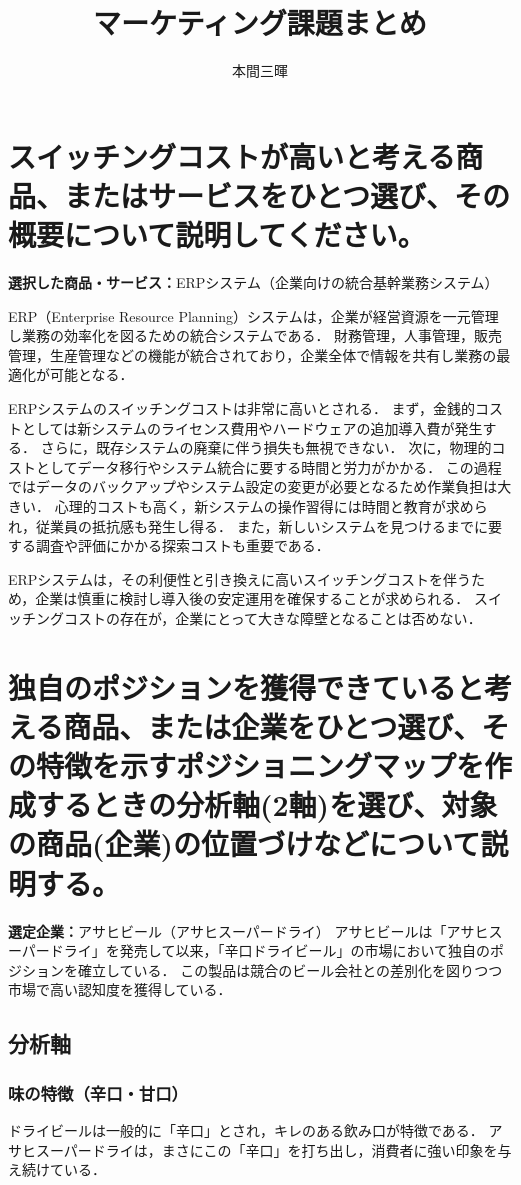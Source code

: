 \documentclass[titlepage,a4paper]{jsarticle}
\title{マーケティング\ajRoman{2}課題まとめ}
\author{本間三暉}
\begin{document}
\maketitle
\section{スイッチングコストが高いと考える商品、またはサービスをひとつ選び、その概要について説明してください。}
\textbf{選択した商品・サービス：}ERPシステム（企業向けの統合基幹業務システム）

ERP（Enterprise Resource Planning）システムは，企業が経営資源を一元管理し業務の効率化を図るための統合システムである．
財務管理，人事管理，販売管理，生産管理などの機能が統合されており，企業全体で情報を共有し業務の最適化が可能となる．

ERPシステムのスイッチングコストは非常に高いとされる．
まず，金銭的コストとしては新システムのライセンス費用やハードウェアの追加導入費が発生する．
さらに，既存システムの廃棄に伴う損失も無視できない．
次に，物理的コストとしてデータ移行やシステム統合に要する時間と労力がかかる．
この過程ではデータのバックアップやシステム設定の変更が必要となるため作業負担は大きい．
心理的コストも高く，新システムの操作習得には時間と教育が求められ，従業員の抵抗感も発生し得る．
また，新しいシステムを見つけるまでに要する調査や評価にかかる探索コストも重要である\cite{slide1}．

ERPシステムは，その利便性と引き換えに高いスイッチングコストを伴うため，企業は慎重に検討し導入後の安定運用を確保することが求められる．
スイッチングコストの存在が，企業にとって大きな障壁となることは否めない\cite{slide1}．

\section{独自のポジションを獲得できていると考える商品、または企業をひとつ選び、その特徴を示すポジショニングマップを作成するときの分析軸(2軸)を選び、対象の商品(企業)の位置づけなどについて説明する。}
\textbf{選定企業：}アサヒビール（アサヒスーパードライ）
アサヒビールは「アサヒスーパードライ」を発売して以来，「辛口ドライビール」の市場において独自のポジションを確立している\cite{slide1}．
この製品は競合のビール会社との差別化を図りつつ市場で高い認知度を獲得している．

\subsection{分析軸}
\subsubsection{味の特徴（辛口・甘口）}
ドライビールは一般的に「辛口」とされ，キレのある飲み口が特徴である．
アサヒスーパードライは，まさにこの「辛口」を打ち出し，消費者に強い印象を与え続けている．
\end{document}
